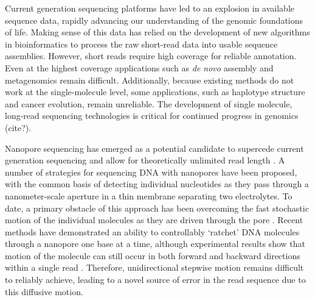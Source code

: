 \documentclass{biophys_letter}
\begin{document}
\begin{multicols}{2}


Current generation sequencing platforms have led to an explosion in available sequence data, rapidly advancing our understanding of the genomic foundations of life.
Making sense of this data has relied on the development of new algorithms in bioinformatics to process the raw short-read data into usable sequence assemblies.
However, short reads require high coverage for reliable annotation.
Even at the highest coverage applications such as {\it de novo} assembly and metagenomics remain difficult.
Additionally, because existing methods do not work at the single-molecule level, some applications, such as haplotype structure and cancer evolution, remain unreliable.
The development of single molecule, long-read sequencing technologies is critical for continued progress in genomics (cite?). 

Nanopore sequencing has emerged as a potential candidate to supercede current generation sequencing and allow for theoretically unlimited read length \cite{Branton:2008}.
A number of strategies for sequencing DNA with nanopores have been proposed, with the common basis of detecting individual nucleotides as they pass through a nanometer-scale aperture in a thin membrane separating two electrolytes.
To date, a primary obstacle of this approach has been overcoming the fast stochastic motion of the individual molecules as they are driven through the pore \cite{Venkatesan:2011, Lu:2011}.
Recent methods have demonstrated an ability to controllably `ratchet' DNA molecules through a nanopore one base at a time, although experimental results show that motion of the molecule can still occur in both forward and backward directions within a single read \cite{Luan:2011, Olasagasti:2010, Cherf:2012}.
Therefore, unidirectional stepwise motion remains difficult to reliably achieve, leading to a novel source of error in the read sequence due to this diffusive motion.


\end{multicols}
\end{document}
